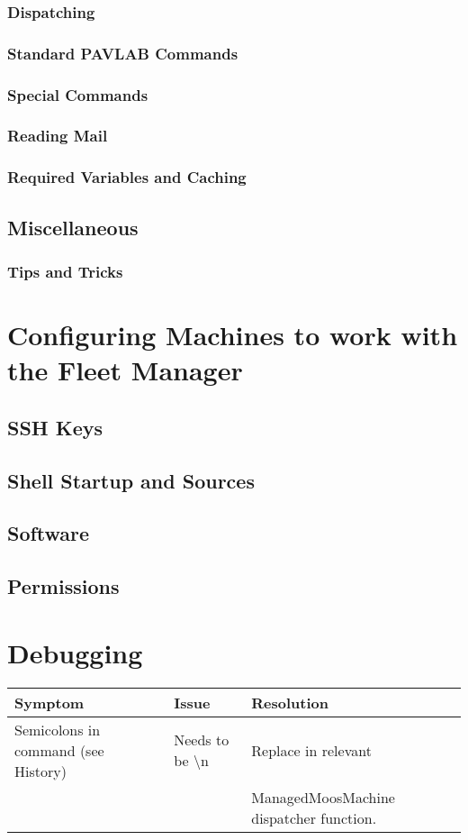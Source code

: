 \documentclass[11pt]{article}
\begin{document}
\subsubsection{Dispatching}
\subsubsection{Standard PAVLAB Commands}
\subsubsection{Special Commands}
\subsubsection{Reading Mail}
\subsubsection{Required Variables and Caching}
\subsection{Miscellaneous}
\subsubsection{Tips and Tricks}
\section{Configuring Machines to work with the Fleet Manager}
\subsection{SSH Keys}
\subsection{Shell Startup and Sources}
\subsection{Software}
\subsection{Permissions}
\section{Debugging}
\begin{tabular}{l|l|l}
Symptom & Issue & Resolution\\
\hline
Semicolons in command (see History) & Needs to be {\textbackslash}n & Replace in relevant\\&& ManagedMoosMachine dispatcher function.
\end{tabular}
\end{document}
